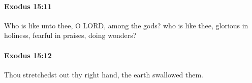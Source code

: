 		\paragraph{Exodus 15:11} %
			\label{EXODUS-15-11}

			Who is like unto thee, O LORD, among the gods? who is like thee, glorious in holiness, fearful in praises, doing wonders?


		\paragraph{Exodus 15:12} %
			\label{EXODUS-15-12}

			Thou stretchedst out thy right hand, the earth swallowed them.


